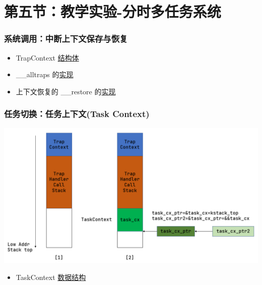 \section{第五节：教学实验-分时多任务系统}%
\begin{frame}
    \frametitle{系统调用：中断上下文保存与恢复}
    \begin{itemize}
        \item  TrapContext \href{https://gitee.com/rcore-os/rCore-Tutorial-v3/blob/ch3-coop/os/src/trap/context.rs\#L4}{结构体}
        \item  \_\_alltraps 的\href{https://gitee.com/rcore-os/rCore-Tutorial-v3/blob/ch3-coop/os/src/trap/trap.S\#L12}{实现}
        \item 上下文恢复的 \_\_restore 的\href{https://gitee.com/rcore-os/rCore-Tutorial-v3/blob/ch3-coop/os/src/trap/trap.S\#L40}{实现}
    \end{itemize}   
\end{frame}
\begin{frame}
    \frametitle{任务切换：任务上下文(Task Context)}
    \includegraphics[width=0.7\linewidth]{figs/task_context.png}
    \begin{itemize}
    \item TaskContext \href{https://gitee.com/rcore-os/rCore-Tutorial-v3/blob/ch3-coop/os/src/task/context.rs\#L2}{数据结构}
    \end{itemize}
\end{frame}
